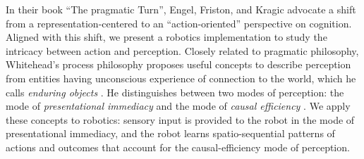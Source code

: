 \documentclass[runningheads]{llncs}
\begin{document}

In their book ``The pragmatic Turn'', Engel, Friston, and Kragic \cite{engel_pragmatic_2015} advocate a shift from a representation-centered to an ``action-oriented'' perspective on cognition.  
Aligned with this shift, we present a robotics implementation to study the intricacy between action and perception.
Closely related to pragmatic philosophy, Whitehead's process philosophy proposes useful concepts to describe perception from entities 
having unconscious experience of connection to the world,
which he calls \textit{enduring objects} \cite{whitehead1929}. 
He distinguishes between two modes of perception: the mode of \textit{presentational immediacy} and the mode of \textit{causal efficiency} \cite{smith_social_2010}. 
We apply these concepts to robotics: sensory input is provided to the robot in the mode of presentational immediacy, and the robot learns spatio-sequential patterns of actions and outcomes that account for the causal-efficiency mode of perception. 

\end{document}
